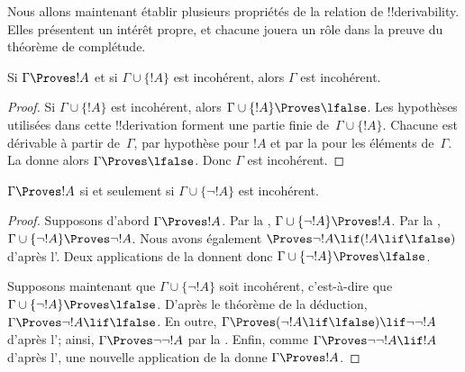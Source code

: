 \documentclass[../../../include/open-logic-section]{subfiles}
\begin{document}
      {}
      {}


Nous allons maintenant établir plusieurs propriétés de la relation de
!!{derivability}. Elles présentent un intérêt propre, et chacune
jouera un rôle dans la preuve du théorème de complétude.

\begin{prop}
Si $\Gamma \Proves !A$ et si $\Gamma \cup \{!A\}$ est incohérent,
alors $\Gamma$ est incohérent.
\end{prop}

\begin{proof}
Si $\Gamma \cup \{!A\}$ est incohérent, alors
$\Gamma \cup \{!A\} \Proves \lfalse$. Les hypothèses utilisées dans
cette !!{derivation} forment une partie finie de~$\Gamma\cup\{!A\}$.
Chacune est dérivable à partir de~$\Gamma$, par hypothèse pour $!A$
et par la  pour les éléments de~$\Gamma$.
La  donne alors
$\Gamma \Proves \lfalse$. Donc $\Gamma$ est incohérent.
\end{proof}

\begin{prop}
$\Gamma \Proves !A$ si et seulement si
$\Gamma \cup \{\lnot !A\}$ est incohérent.
\end{prop}

\begin{proof}
Supposons d'abord $\Gamma \Proves !A$. Par la
,
$\Gamma \cup \{\lnot !A\} \Proves !A$. Par la
,
$\Gamma \cup \{\lnot !A\} \Proves \lnot !A$. Nous avons également
$\Proves \lnot !A \lif (!A \lif \lfalse)$ d'après
l'. Deux applications de la
 donnent donc
$\Gamma \cup \{\lnot !A\} \Proves \lfalse$.

Supposons maintenant que $\Gamma \cup \{\lnot !A\}$ soit incohérent,
c'est-à-dire que
$\Gamma \cup \{\lnot !A\} \Proves \lfalse$. D'après le théorème de
la déduction, $\Gamma \Proves \lnot !A \lif \lfalse$. En outre,
$\Gamma \Proves (\lnot !A \lif \lfalse) \lif \lnot\lnot !A$ d'après
l'; ainsi,
$\Gamma \Proves \lnot\lnot !A$ par la . Enfin,
comme $\Gamma \Proves \lnot\lnot !A \lif !A$ d'après
l', une nouvelle application de la
 donne $\Gamma \Proves !A$.
\end{proof}
\end{document}

